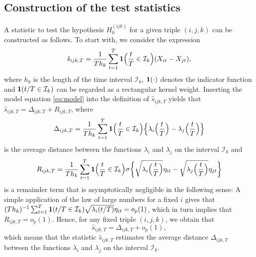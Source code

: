 \documentclass[a4paper,12pt]{article}
\numberwithin{equation}{section}
\begin{document}
{\color{red}
\subsection{Construction of the test statistics}\label{subsec:test:test}


A statistic to test the hypothesis $H_0^{(ijk)}$ for a given triple $(i,j,k)$ can be constructed as follows. To start with, we consider the expression 
\[ \hat{s}_{ijk,T} = \frac{1}{Th_k} \sum\limits_{t=1}^T \boldsymbol{1}\Big(\frac{t}{T} \in \mathcal{I}_k\Big) (X_{it} - X_{jt}), \]
where $h_k$ is the length of the time interval $\mathcal{I}_k$, $\boldsymbol{1}(\cdot)$ denotes the indicator function and $\boldsymbol{1}(t/T \in \mathcal{I}_k)$ can be regarded as a rectangular kernel weight. Inserting the model equation \eqref{eq:model} into the definition of $\hat{s}_{ijk,T}$ yields that $\hat{s}_{ijk,T} = \Delta_{ijk,T} + R_{ijk,T}$, where 
\begin{equation*}
\Delta_{ijk,T} = \frac{1}{Th_k} \sum\limits_{t=1}^T \boldsymbol{1}\Big(\frac{t}{T} \in \mathcal{I}_k\Big) \Big\{ \lambda_i \Big(\frac{t}{T}\Big)  - \lambda_j \Big(\frac{t}{T}\Big)\Big\} 
\end{equation*}
is the average distance between the functions $\lambda_i$ and $\lambda_j$ on the interval $\mathcal{I}_k$ and 
\begin{equation*}
R_{ijk,T} = \frac{1}{Th_k} \sum\limits_{t=1}^T \boldsymbol{1}\Big(\frac{t}{T} \in \mathcal{I}_k\Big) \sigma \bigg\{ \sqrt{ \lambda_i\Big(\frac{t}{T}\Big)} \eta_{it} - \sqrt{ \lambda_j\Big(\frac{t}{T}\Big)} \eta_{jt} \bigg\} 
\end{equation*}
is a remainder term that is asymptotically negligible in the following sense: A simple application of the law of large numbers for a fixed $i$ gives that $(Th_k)^{-1} \sum_{t=1}^T \boldsymbol{1}(t/T \in \mathcal{I}_k) \sqrt{\lambda_i(t/T)} \eta_{it} = o_p(1)$, which in turn implies that $R_{ijk,T} = o_p(1)$. Hence, for any fixed triple $(i,j,k)$, we obtain that 
\[ \hat{s}_{ijk,T} = \Delta_{ijk,T} + o_p(1), \]
which means that the statistic $\hat{s}_{ijk,T}$ estimates the average distance $\Delta_{ijk,T}$ between the functions $\lambda_i$ and $\lambda_j$ on the interval $\mathcal{I}_k$. 


}
\end{document}
